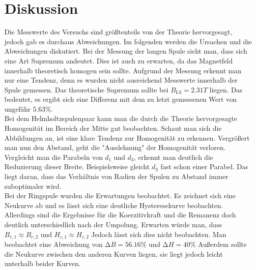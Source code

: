 \section{Diskussion}
\label{sec:Diskussion}

Die Messwerte des Versuchs sind größtenteils von der Theorie hervorgesagt, jedoch gab es durchaus Abweichungen.
Im folgenden werden die Ursachen und die Abweichungen diskutiert.
Bei der Messung der langen Spule sieht man, dass sich eine Art Supremum andeutet.
Dies ist auch zu erwarten, da das Magnetfeld innerhalb theoretisch homogen sein sollte.
Aufgrund der Messung erkennt man nur eine Tendenz, denn es wurden nicht ausreichend Messwerte innerhalb der Spule gemessen.
Das theoretische Supremum sollte bei $B_{\text{LS}} = 2.31 T$ liegen.
Das bedeutet, es ergibt sich eine Differenz mit dem zu letzt gemessenen Wert von ungefähr $5.63\%$. \\

Bei dem Helmholtzspulenpaar kann man die durch die Theorie hervorgesagte Homogenität im Bereich der Mitte gut beobachten.
Schaut man sich die Abbildungen an, ist eine klare Tendenz zur Homogenität zu erkennen.
Vergrößert man nun den Abstand, geht die "Ausdehnung" der Homogenität verloren.
Vergleicht man die Parabeln von $d_{1}$ und $d_{3}$, erkennt man deutlich die Reduzierung dieser Breite.
Beispielsweise gleicht $d_{3}$ fast schon einer Parabel.
Das liegt daran, dass das Verhältnis von Radien der Spulen zu Abstand immer suboptimaler wird.  \\

Bei der Ringspule wurden die Erwartungen beobachtet.
Es zeichnet sich eine Neukurve ab und es lässt sich eine deutliche Hysteresekurve beobachten.
Allerdings sind die Ergebnisse für die Koerzitivkraft und die Remanenz doch deutlich unterschiedlich nach der Umpolung.
Erwarten würde man, dass $B_{r,1} \approx B_{r,2}$ und $H_{c,1} \approx H_{c,2}$
Jedoch lässt sich dies nicht beobachten. 
Man beobachtet eine Abweichung von $\increment B = 56.16 \%$ und  $\increment H = 40 \%$
Außerdem sollte die Neukurve zwischen den anderen Kurven liegen, sie liegt jedoch leicht unterhalb beider Kurven.